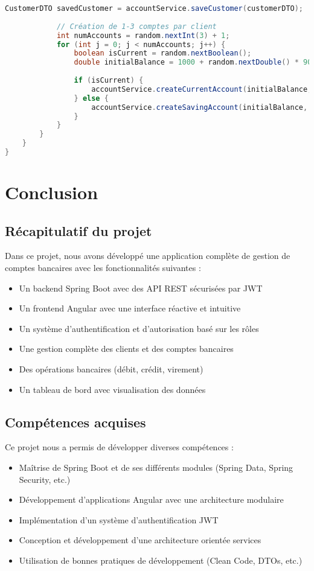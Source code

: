 \documentclass[12pt,a4paper]{report}
\newcounter{screenshotcounter}[chapter]
\begin{document}
\begin{lstlisting}[language=Java, caption=DataInitializer.java]
            CustomerDTO savedCustomer = accountService.saveCustomer(customerDTO);
            
            // Création de 1-3 comptes par client
            int numAccounts = random.nextInt(3) + 1;
            for (int j = 0; j < numAccounts; j++) {
                boolean isCurrent = random.nextBoolean();
                double initialBalance = 1000 + random.nextDouble() * 90000;
                
                if (isCurrent) {
                    accountService.createCurrentAccount(initialBalance, 1000, savedCustomer.getId());
                } else {
                    accountService.createSavingAccount(initialBalance, 3.5, savedCustomer.getId());
                }
            }
        }
    }
}
\end{lstlisting}

\chapter{Conclusion}

\section{Récapitulatif du projet}
Dans ce projet, nous avons développé une application complète de gestion de comptes bancaires avec les fonctionnalités suivantes :
\begin{itemize}
    \item Un backend Spring Boot avec des API REST sécurisées par JWT
    \item Un frontend Angular avec une interface réactive et intuitive
    \item Un système d'authentification et d'autorisation basé sur les rôles
    \item Une gestion complète des clients et des comptes bancaires
    \item Des opérations bancaires (débit, crédit, virement)
    \item Un tableau de bord avec visualisation des données
\end{itemize}

\section{Compétences acquises}
Ce projet nous a permis de développer diverses compétences :
\begin{itemize}
    \item Maîtrise de Spring Boot et de ses différents modules (Spring Data, Spring Security, etc.)
    \item Développement d'applications Angular avec une architecture modulaire
    \item Implémentation d'un système d'authentification JWT
    \item Conception et développement d'une architecture orientée services
    \item Utilisation de bonnes pratiques de développement (Clean Code, DTOs, etc.)
\end{itemize}
\end{document}
